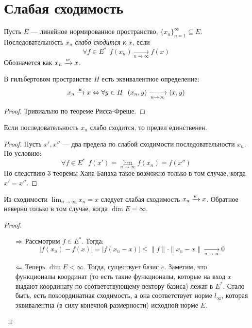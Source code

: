 \setcounter{section}{6}
\section{Слабая сходимость}

\begin{definition}
	Пусть $E$ --- линейное нормированное пространство, $\{x_n\}_{n = 1}^\infty \subseteq E$. Последовательность $x_n$ \textit{слабо сходится к} $x$, если
	\[
		\forall f \in E^*\ \ f(x_n) \xrightarrow[n \to \infty]{} f(x)
	\]
	Обозначется как $x_n \xrightarrow{w} x$.
\end{definition}

\begin{proposition}
	В гильбертовом пространстве $H$ есть эквивалентное определение:
	\[
	x_n \xrightarrow{w} x \Leftrightarrow \forall y \in H\ \ (x_n, y) \xrightarrow[n \to \infty]{} (x, y)
	\]
\end{proposition}

\begin{proof}
	Тривиально по теореме Рисса-Фреше.
\end{proof}

\begin{proposition}
	Если последовательность $x_n$ слабо сходится, то предел единственен.
\end{proposition}

\begin{proof}
	Пусть $x', x''$ --- два предела по слабой сходимости последовательности $x_n$. По условию:
	\[
		\forall f \in E^*\ \ f(x') = \lim_{n \to \infty} f(x_n) = f(x'')
	\]
	По следствию 3 теоремы Хана-Банаха такое возможно только в том случае, когда $x' = x''$.
\end{proof}

\begin{proposition}
	Из сходимости $\lim_{n \to \infty} x_n = x$ следует слабая сходимость $x_n \xrightarrow{w} x$. Обратное неверно только в том случае, когда $\dim E = \infty$.
\end{proposition}

\begin{proof}~
	\begin{itemize}
		\item[$\Rightarrow$] Рассмотрим $f \in E^*$. Тогда:
		\[
			|f(x_n) - f(x)| = |f(x_n - x)| \le \|f\| \cdot \|x_n - x\| \xrightarrow[n \to \infty]{} 0
		\]
		
		\item[$\Leftarrow$] Теперь $\dim E < \infty$. Тогда, существует базис $e$. Заметим, что функционалы координат (то есть такие функционалы, которые на вход $x$ выдают координату по соответствующему вектору базиса) лежат в $E^*$. Стало быть, есть покоординатная сходимость, а она соответствует норме $l_\infty$, которая эквивалентна (в силу конечной размерности) исходной норме $E$.
	\end{itemize}
\end{proof}

